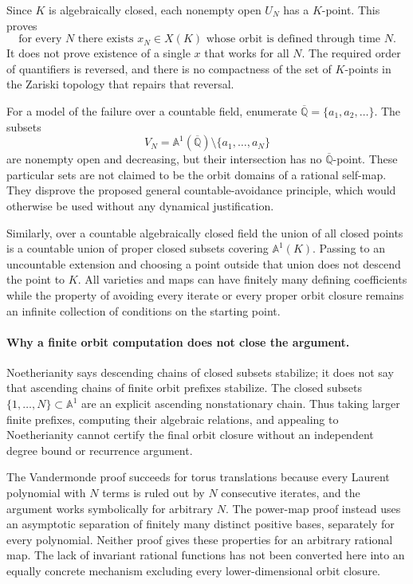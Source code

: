 \documentclass[11pt]{article}
\begin{document}
Since $K$ is algebraically closed, each nonempty open $U_N$ has a
$K$-point. This proves
\[
 \text{for every }N\text{ there exists }x_N\in X(K)
 \text{ whose orbit is defined through time }N.
\]
It does not prove existence of a single $x$ that works for all $N$.
The required order of quantifiers is reversed, and there is no compactness
of the set of $K$-points in the Zariski topology that repairs that reversal.

For a model of the failure over a countable field, enumerate
$\overline{\mathbb Q}=\{a_1,a_2,\ldots\}$. The subsets
\[
 V_N=\mathbb A^1(\overline{\mathbb Q})\setminus\{a_1,\ldots,a_N\}
\]
are nonempty open and decreasing, but their intersection has no
$\overline{\mathbb Q}$-point. These particular sets are not claimed to be
the orbit domains of a rational self-map. They disprove the proposed
general countable-avoidance principle, which would otherwise be used
without any dynamical justification.

Similarly, over a countable algebraically closed field the union of all
closed points is a countable union of proper closed subsets covering
$\mathbb A^1(K)$. Passing to an uncountable extension and choosing a
point outside that union does not descend the point to $K$. All varieties
and maps can have finitely many defining coefficients while the property
of avoiding every iterate or every proper orbit closure remains an
infinite collection of conditions on the starting point.

\paragraph{Why a finite orbit computation does not close the argument.}
Noetherianity says descending chains of closed subsets stabilize; it does
not say that ascending chains of finite orbit prefixes stabilize. The
closed subsets $\{1,\ldots,N\}\subset\mathbb A^1$ are an explicit
ascending nonstationary chain. Thus taking larger finite prefixes,
computing their algebraic relations, and appealing to Noetherianity cannot
certify the final orbit closure without an independent degree bound or
recurrence argument.

The Vandermonde proof succeeds for torus translations because every
Laurent polynomial with $N$ terms is ruled out by $N$ consecutive iterates,
and the argument works symbolically for arbitrary $N$. The power-map
proof instead uses an asymptotic separation of finitely many distinct
positive bases, separately for every polynomial. Neither proof gives
these properties for an arbitrary rational map. The lack of invariant
rational functions has not been converted here into an equally concrete
mechanism excluding every lower-dimensional orbit closure.
\end{document}
